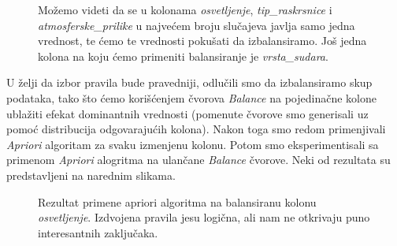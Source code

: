 \documentclass[a4paper,10pt]{article}
\begin{document}
\begin{figure}[!h]
 \centering
 \label{fig:data_audit}
 \caption{Možemo videti da se u kolonama \textit{osvetljenje}, \textit{tip\_raskrsnice} i \textit{atmosferske\_prilike} u 
 najvećem broju slučajeva javlja samo jedna vrednost, te ćemo te vrednosti pokušati da izbalansiramo. Još jedna kolona na koju ćemo 
 primeniti balansiranje je \textit{vrsta\_sudara}.}
\end{figure}

U želji da izbor pravila bude pravedniji, odlučili smo da izbalansiramo skup podataka, tako što 
ćemo korišćenjem čvorova \textit{Balance} na pojedinačne kolone ublažiti efekat dominantnih vrednosti (pomenute čvorove
smo generisali uz pomoć distribucija odgovarajućih kolona). Nakon toga smo redom primenjivali \textit{Apriori}
algoritam za svaku izmenjenu kolonu. Potom smo eksperimentisali sa primenom \textit{Apriori} alogritma na ulančane \textit{Balance} čvorove. 
Neki od rezultata su predstavljeni na narednim slikama.

\begin{figure}[!h]
 \centering
 \caption{Rezultat primene apriori algoritma na balansiranu kolonu \textit{osvetljenje}. Izdvojena pravila jesu logična, ali nam 
 ne otkrivaju puno interesantnih zaključaka.}
\end{figure}
\end{document}
